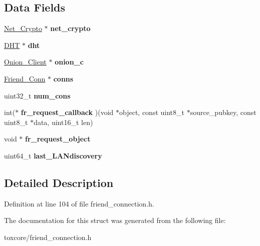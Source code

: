 \subsection*{Data Fields}
\begin{DoxyCompactItemize}
\item 
\hypertarget{struct_friend___connections_ab06a41217a1e9b5985555e19e088ae94}{\hyperlink{struct_net___crypto}{Net\+\_\+\+Crypto} $\ast$ {\bfseries net\+\_\+crypto}}\label{struct_friend___connections_ab06a41217a1e9b5985555e19e088ae94}

\item 
\hypertarget{struct_friend___connections_a8b3d6ce8745acc52695e252bdb1531b6}{\hyperlink{struct_d_h_t}{D\+H\+T} $\ast$ {\bfseries dht}}\label{struct_friend___connections_a8b3d6ce8745acc52695e252bdb1531b6}

\item 
\hypertarget{struct_friend___connections_ae202b81f9a2c2fa80fd310a0996795fc}{\hyperlink{struct_onion___client}{Onion\+\_\+\+Client} $\ast$ {\bfseries onion\+\_\+c}}\label{struct_friend___connections_ae202b81f9a2c2fa80fd310a0996795fc}

\item 
\hypertarget{struct_friend___connections_a2690adb6c61682af2e8592f53e9de9a0}{\hyperlink{struct_friend___conn}{Friend\+\_\+\+Conn} $\ast$ {\bfseries conns}}\label{struct_friend___connections_a2690adb6c61682af2e8592f53e9de9a0}

\item 
\hypertarget{struct_friend___connections_a81ac77652d6cc5071baca915581c5dfa}{uint32\+\_\+t {\bfseries num\+\_\+cons}}\label{struct_friend___connections_a81ac77652d6cc5071baca915581c5dfa}

\item 
\hypertarget{struct_friend___connections_a36e4f0e3167d9e95df5d7f83cbafa7fc}{int($\ast$ {\bfseries fr\+\_\+request\+\_\+callback} )(void $\ast$object, const uint8\+\_\+t $\ast$source\+\_\+pubkey, const uint8\+\_\+t $\ast$data, uint16\+\_\+t len)}\label{struct_friend___connections_a36e4f0e3167d9e95df5d7f83cbafa7fc}

\item 
\hypertarget{struct_friend___connections_abd31f2a386ec582b378de4fc3f05ea6c}{void $\ast$ {\bfseries fr\+\_\+request\+\_\+object}}\label{struct_friend___connections_abd31f2a386ec582b378de4fc3f05ea6c}

\item 
\hypertarget{struct_friend___connections_a4f77ba6531c78b4f6a2a46843d06cc26}{uint64\+\_\+t {\bfseries last\+\_\+\+L\+A\+Ndiscovery}}\label{struct_friend___connections_a4f77ba6531c78b4f6a2a46843d06cc26}

\end{DoxyCompactItemize}


\subsection{Detailed Description}


Definition at line 104 of file friend\+\_\+connection.\+h.



The documentation for this struct was generated from the following file\+:\begin{DoxyCompactItemize}
\item 
toxcore/friend\+\_\+connection.\+h\end{DoxyCompactItemize}
